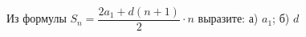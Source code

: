 \begin{ex}
	\begin{condition}
		Из формулы \( S_n=\dfrac{2a_1+d(n+1)}{2}\cdot n \) выразите: а) \( a_1 \); б) \( d \)
	\end{condition}
\end{ex}